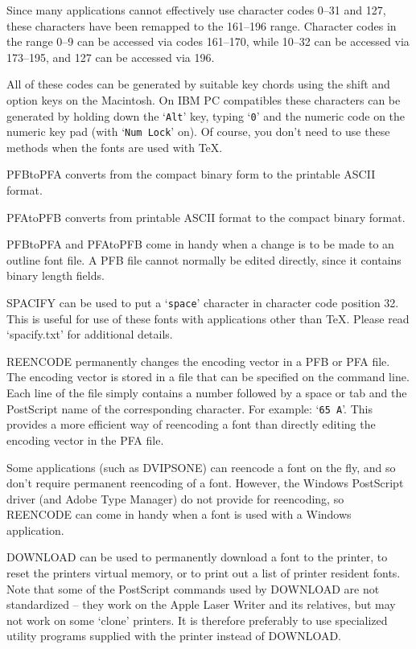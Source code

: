 
Since many applications cannot effectively use character codes 0--31 and 127,
these characters have been remapped to the 161--196 range.
Character codes in the range 0--9 can be accessed via codes 161--170, while
10--32 can be accessed via 173--195, and 127 can be accessed via 196.

All of these codes can be generated by suitable key chords using the shift
and option keys on the Macintosh.  On IBM PC compatibles these characters can
be generated by holding down the `{\tt Alt}' key, typing `{\tt 0}' and the numeric code
on the numeric key pad (with `{\tt Num Lock}' on).  
Of course, you don't need to use these methods when
the fonts are used with TeX.


PFBtoPFA converts from the compact binary form to the printable ASCII format.

PFAtoPFB converts from printable ASCII format to the compact binary format.

PFBtoPFA and PFAtoPFB come in handy when a change is to be made to an outline
font file.  A PFB file cannot normally be edited directly, since it contains
binary length fields.

SPACIFY can be used to put a `{\tt space}' character in character code
position 32.  This is useful for use of these fonts with applications
other than TeX.  Please read `spacify.txt' for additional details.

REENCODE permanently changes the encoding vector in a PFB or PFA file.
The encoding vector is stored in a file that can be specified on the
command line.  Each line of the file simply contains a number followed by a
space or tab and the PostScript name of the corresponding character.
For example:	`{\tt 65	A}'.  This provides a more efficient way of reencoding
a font than directly editing the encoding vector in the PFA file.

Some applications (such as DVIPSONE) can reencode a font on the fly, and so
don't require permanent reencoding of a font.  However, the Windows
PostScript driver (and Adobe Type Manager) do not provide for reencoding,
so REENCODE can come in handy when a font is used with a Windows application.

DOWNLOAD can be used to permanently download a font to the printer, to
reset the printers virtual memory, or to print out a list of printer resident
fonts.  Note that some of the PostScript commands used by DOWNLOAD are not
standardized -- they work on the Apple Laser Writer and its relatives, but
may not work on some `clone' printers.  It is therefore preferably to use
specialized utility programs supplied with the printer instead of DOWNLOAD.

